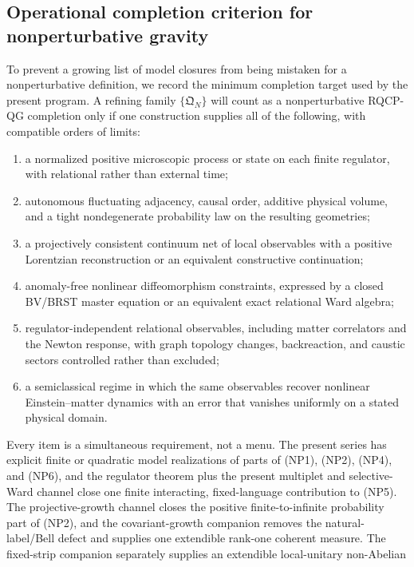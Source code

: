 \subsection{Operational completion criterion for nonperturbative gravity}
\label{sec:nonperturbative-completion-criterion}

To prevent a growing list of model closures from being mistaken for a
nonperturbative definition, we record the minimum completion target used by
the present program.  A refining family \(\{\mathfrak Q_N\}\) will count as
a nonperturbative RQCP-QG completion only if one construction supplies all
of the following, with compatible orders of limits:
\begin{enumerate}[label=(NP\arabic*)]
\item a normalized positive microscopic process or state on each finite
  regulator, with relational rather than external time;
\item autonomous fluctuating adjacency, causal order, additive physical
  volume, and a tight nondegenerate probability law on the resulting
  geometries;
\item a projectively consistent continuum net of local observables with a
  positive Lorentzian reconstruction or an equivalent constructive
  continuation;
\item anomaly-free nonlinear diffeomorphism constraints, expressed by a
  closed BV/BRST master equation or an equivalent exact relational Ward
  algebra;
\item regulator-independent relational observables, including matter
  correlators and the Newton response, with graph topology changes,
  backreaction, and caustic sectors controlled rather than excluded;
\item a semiclassical regime in which the same observables recover
  nonlinear Einstein--matter dynamics with an error that vanishes
  uniformly on a stated physical domain.
\end{enumerate}
Every item is a simultaneous requirement, not a menu.  The present series
has explicit finite or quadratic model realizations of parts of (NP1),
(NP2), (NP4), and (NP6), and the regulator theorem plus the present
multiplet and selective-Ward channel close one finite interacting,
fixed-language contribution to (NP5).  The projective-growth channel closes
the positive finite-to-infinite probability part of (NP2), and the
covariant-growth companion removes the natural-label/Bell defect and
supplies one extendible rank-one coherent measure.  The fixed-strip
companion separately supplies an extendible local-unitary non-Abelian
